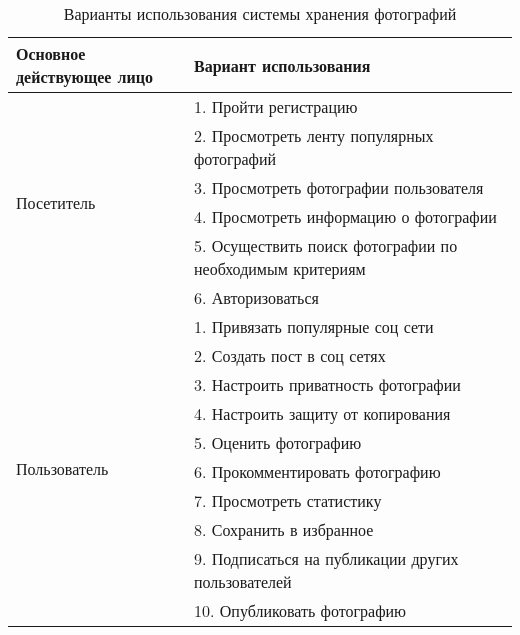 \begin{table}[H]
  \caption{Варианты использования системы хранения фотографий}\label{use-case-table}
  \begin{tabular}{|p{6cm}|p{10cm}|}
  \hline Основное действующее лицо & Вариант использования \\
  \hline \multirow{6}{*}{Посетитель} & 1. Пройти регистрацию \\
  \cline{2-2} & 2. Просмотреть ленту популярных фотографий \\
  \cline{2-2} & 3. Просмотреть фотографии пользователя \\
  \cline{2-2} & 4. Просмотреть информацию о фотографии \\
  \cline{2-2} & 5. Осуществить поиск фотографии по необходимым критериям \\
  \cline{2-2} & 6. Авторизоваться \\
  \hline \multirow{10}{*}{Пользователь} & 1. Привязать популярные соц сети \\
  \cline{2-2} & 2. Создать пост в соц сетях \\
  \cline{2-2} & 3. Настроить приватность фотографии \\
  \cline{2-2} & 4. Настроить защиту от копирования \\
  \cline{2-2} & 5. Оценить фотографию \\
  \cline{2-2} & 6. Прокомментировать фотографию \\
  \cline{2-2} & 7. Просмотреть статистику \\
  \cline{2-2} & 8. Сохранить в избранное \\
  \cline{2-2} & 9. Подписаться на публикации других пользователей \\
  \cline{2-2} & 10. Опубликовать фотографию \\
  \hline
  \end{tabular}
\end{table}


